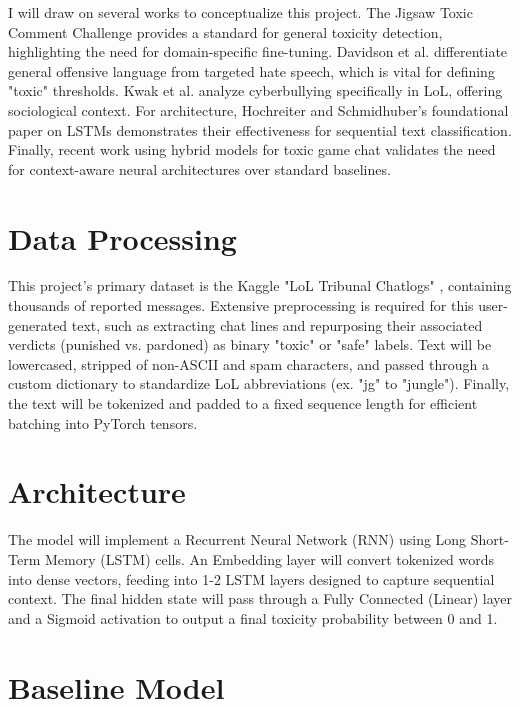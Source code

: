 I will draw on several works to conceptualize this project. The Jigsaw Toxic Comment Challenge \cite{jigsaw} provides a standard for general toxicity detection, highlighting the need for domain-specific fine-tuning. Davidson et al. \cite{davidson2017} differentiate general offensive language from targeted hate speech, which is vital for defining "toxic" thresholds. Kwak et al. \cite{kwak2015} analyze cyberbullying specifically in LoL, offering sociological context. For architecture, Hochreiter and Schmidhuber's foundational paper on LSTMs \cite{hochreiter1997} demonstrates their effectiveness for sequential text classification. Finally, recent work using hybrid models for toxic game chat \cite{toxic_chat_rg} validates the need for context-aware neural architectures over standard baselines.

\section*{Data Processing}

This project's primary dataset is the Kaggle "LoL Tribunal Chatlogs" \cite{kaggle_tribunal}, containing thousands of reported messages. Extensive preprocessing is required for this user-generated text, such as extracting chat lines and repurposing their associated verdicts (punished vs. pardoned) as binary "toxic" or "safe" labels. Text will be lowercased, stripped of non-ASCII and spam characters, and passed through a custom dictionary to standardize LoL abbreviations (ex. "jg" to "jungle"). Finally, the text will be tokenized and padded to a fixed sequence length for efficient batching into PyTorch tensors.

\section*{Architecture}

The model will implement a Recurrent Neural Network (RNN) using Long Short-Term Memory (LSTM) cells. An Embedding layer will convert tokenized words into dense vectors, feeding into 1-2 LSTM layers designed to capture sequential context. The final hidden state will pass through a Fully Connected (Linear) layer and a Sigmoid activation to output a final toxicity probability between 0 and 1.

\section*{Baseline Model}

